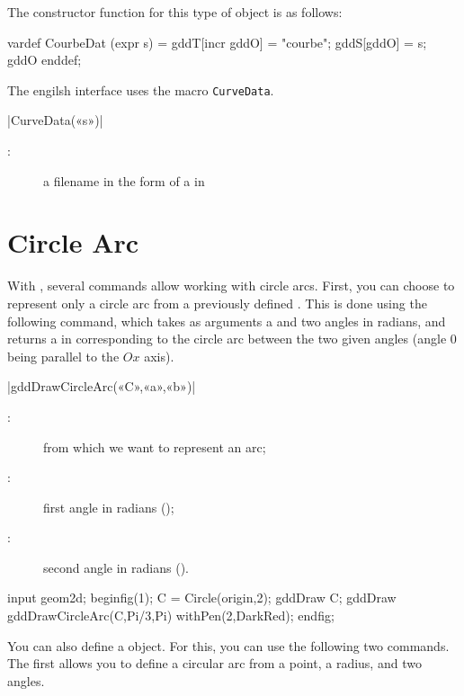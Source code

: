 \documentclass[a4paper,english]{article}
\begin{document}
The constructor function for this type of object is as follows:
\begin{mpcode}
vardef CourbeDat (expr s) =
  gddT[incr gddO] = "courbe"; gddS[gddO] = s; gddO
enddef;
\end{mpcode}

The engilsh interface uses the macro \lstinline+CurveData+.

\begin{colourband}
\macro|CurveData(«s»)|
\begin{description}
  \item[:] a filename in the form of a  in \MP
\end{description}
\end{colourband}

\bigskip

\section{Circle Arc}

With \mpgeomdd{}, several commands allow working with circle arcs. First, you
can choose to represent only a circle arc from a previously defined
. This is done using the following command, which takes as
arguments a  and two angles in radians, and returns a
 in \MP{} corresponding to the circle arc between the two given
angles (angle 0 being parallel to the $Ox$ axis).

\begin{colourband}
\macro|gddDrawCircleArc(«C»,«a»,«b»)|
\begin{description}
  \item[:]  from which we want to represent an arc;
  \item[:] first angle in radians ();
  \item[:] second angle in radians ().
\end{description}
\end{colourband}

\begin{ExempleMP}
input geom2d;
beginfig(1);
C = Circle(origin,2);
gddDraw C;
gddDraw gddDrawCircleArc(C,Pi/3,Pi) withPen(2,DarkRed);
endfig;
\end{ExempleMP}
You can also define a  object. For this, you can use the following two commands. The first allows you to define a circular arc from a point, a radius, and two angles.
\end{document}
